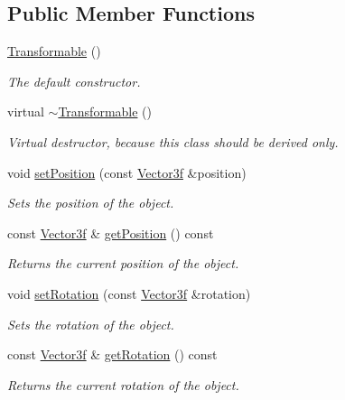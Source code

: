 \subsection*{Public Member Functions}
\begin{DoxyCompactItemize}
\item 
\hyperlink{classburn_1_1_transformable_ab5df8f6f319ebc8888465632a1567981}{Transformable} ()
\begin{DoxyCompactList}\small\item\em The default constructor. \end{DoxyCompactList}\item 
virtual \hyperlink{classburn_1_1_transformable_ac3b6e91f17a6b8f5db8027e72942f269}{$\sim$\-Transformable} ()
\begin{DoxyCompactList}\small\item\em Virtual destructor, because this class should be derived only. \end{DoxyCompactList}\item 
void \hyperlink{classburn_1_1_transformable_a408d484d0ed48c1d7499391b3f2d4a66}{set\-Position} (const \hyperlink{namespaceburn_afdd7cfb352b9612432faf6947b6fff74}{Vector3f} \&position)
\begin{DoxyCompactList}\small\item\em Sets the position of the object. \end{DoxyCompactList}\item 
const \hyperlink{namespaceburn_afdd7cfb352b9612432faf6947b6fff74}{Vector3f} \& \hyperlink{classburn_1_1_transformable_aab2eb6fb8e64349a9f83bc6939477b74}{get\-Position} () const 
\begin{DoxyCompactList}\small\item\em Returns the current position of the object. \end{DoxyCompactList}\item 
void \hyperlink{classburn_1_1_transformable_adad877d654e3ac20ed0ff6edf002e040}{set\-Rotation} (const \hyperlink{namespaceburn_afdd7cfb352b9612432faf6947b6fff74}{Vector3f} \&rotation)
\begin{DoxyCompactList}\small\item\em Sets the rotation of the object. \end{DoxyCompactList}\item 
const \hyperlink{namespaceburn_afdd7cfb352b9612432faf6947b6fff74}{Vector3f} \& \hyperlink{classburn_1_1_transformable_af16b32fb2143e7a459b8446e898c4359}{get\-Rotation} () const 
\begin{DoxyCompactList}\small\item\em Returns the current rotation of the object. \end{DoxyCompactList}\item 

\end{DoxyCompactItemize}
